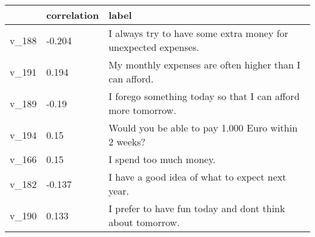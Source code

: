 \begin{tabular}{lll}
\hline
 & correlation & label \\
\hline
v\_188 & -0.204 & I always try to have some extra money for unexpected expenses. \\
v\_191 & 0.194 & My monthly expenses are often higher than I can afford. \\
v\_189 & -0.19 & I forego something today so that I can afford more tomorrow. \\
v\_194 & 0.15 & Would you be able to pay 1.000 Euro within 2 weeks? \\
v\_166 & 0.15 & I spend too much money. \\
v\_182 & -0.137 & I have a good idea of what to expect next year. \\
v\_190 & 0.133 & I prefer to have fun today and dont think about tomorrow. \\
\hline
\end{tabular}
